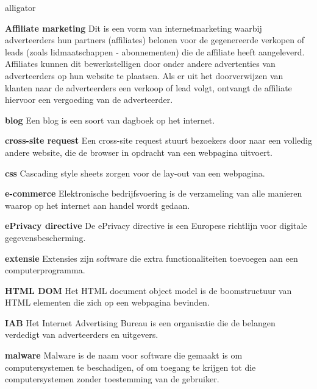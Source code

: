 \documentclass[pdftex,a4paper,12pt,twoside]{report}
\begin{document}
\newpage 
\begin{labeling}{alligator}

\item [\textbf{Affiliate marketing}] Dit is een vorm van internetmarketing waarbij adverteerders hun partners (affiliates) belonen voor de gegenereerde verkopen of leads (zoals lidmaatschappen - abonnementen) die de affiliate heeft aangeleverd. Affiliates kunnen dit bewerkstelligen door onder andere advertenties van adverteerders op hun website te plaatsen. Als er uit het doorverwijzen van klanten naar de adverteerders een verkoop of lead volgt, ontvangt de affiliate hiervoor een vergoeding van de adverteerder.


\item [\textbf{blog}] Een blog is een soort van dagboek op het internet.

\item [\textbf{cross-site request}] Een cross-site request stuurt bezoekers door naar een volledig andere website, die de browser in opdracht van een webpagina uitvoert.

\item [\textbf{css}] Cascading style sheets zorgen voor de lay-out van een webpagina.

\item [\textbf{e-commerce}] Elektronische bedrijfsvoering is de verzameling van alle manieren waarop op het internet aan handel wordt gedaan.

\item [\textbf{ePrivacy directive}] De ePrivacy directive is een Europese richtlijn voor digitale gegevensbescherming.

\item [\textbf{extensie}] Extensies zijn software die extra functionaliteiten toevoegen aan een computerprogramma. 

\item [\textbf{HTML DOM}] Het HTML document object model is de boomstructuur van HTML elementen die zich op een webpagina bevinden.

\item [\textbf{IAB}] Het Internet Advertising Bureau is een organisatie die de belangen verdedigt van adverteerders en uitgevers.

\item [\textbf{malware}] Malware is de naam voor software die gemaakt is om computersystemen te beschadigen, of om toegang te krijgen tot die computersystemen zonder toestemming van de gebruiker.


\end{labeling}
\end{document}
